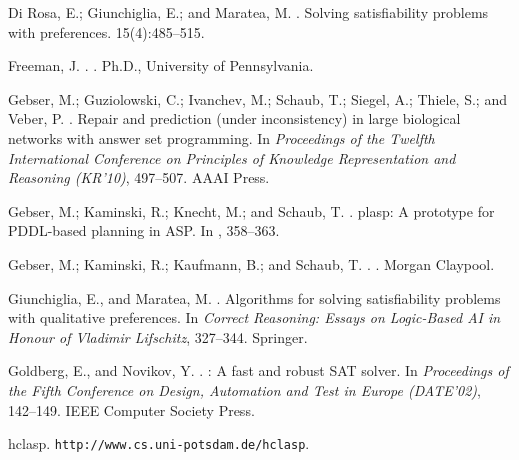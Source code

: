 \begin{thebibliography}{}
{Di Rosa}, E.; Giunchiglia, E.; and Maratea, M.
.
\newblock Solving satisfiability problems with preferences.
 15(4):485--515.

Freeman, J.
.
.
\newblock Ph.D., University of Pennsylvania.

Gebser, M.; Guziolowski, C.; Ivanchev, M.; Schaub, T.; Siegel, A.; Thiele, S.;
  and Veber, P.
.
\newblock Repair and prediction (under inconsistency) in large biological
  networks with answer set programming.
\newblock In {\em Proceedings of the Twelfth
  International Conference on Principles of Knowledge Representation and
  Reasoning (KR'10)},  497--507.
\newblock AAAI Press.

Gebser, M.; Kaminski, R.; Knecht, M.; and Schaub, T.
.
\newblock plasp: A prototype for {PDDL}-based planning in {ASP}.
\newblock In ,  358--363.

Gebser, M.; Kaminski, R.; Kaufmann, B.; and Schaub, T.
.
.
\newblock  Morgan Claypool.

Giunchiglia, E., and Maratea, M.
.
\newblock Algorithms for solving satisfiability problems with qualitative
  preferences.
\newblock In {\em
  Correct Reasoning: Essays on Logic-Based {AI} in Honour of {V}ladimir
  {L}ifschitz},
  327--344.
\newblock Springer.

Goldberg, E., and Novikov, Y.
.
: A fast and robust {SAT} solver.
\newblock In {\em Proceedings of the Fifth Conference on Design, Automation and
  Test in Europe (DATE'02)},  142--149.
\newblock IEEE Computer Society Press.

\newblock hclasp. \texttt{http://www.cs.uni-potsdam.de/hclasp}.


\end{thebibliography}
